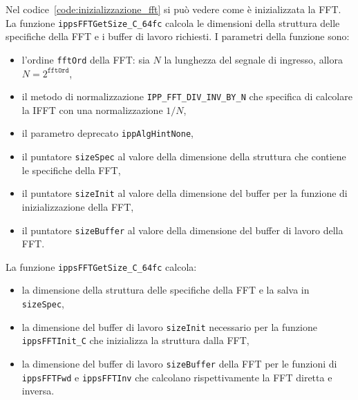 \documentclass[12pt,a4paper,titlepage]{article}
\begin{document}
Nel codice~\ref{code:inizializzazione_fft} si può vedere come è inizializzata la FFT. La funzione \texttt{ippsFFTGetSize\_C\_64fc} calcola le dimensioni della struttura delle specifiche della FFT e i buffer di lavoro richiesti. I parametri della funzione sono:
\begin{itemize}
\item l'ordine \texttt{fftOrd} della FFT: sia $N$ la lunghezza del segnale di ingresso, allora $N = 2^{ \texttt{fftOrd}}$,
\item il metodo di normalizzazione \texttt{IPP\_FFT\_DIV\_INV\_BY\_N} che specifica di calcolare la IFFT con una normalizzazione $1/N$,
\item il parametro deprecato \texttt{ippAlgHintNone},
\item il puntatore \texttt{sizeSpec} al valore della dimensione della struttura che contiene le specifiche della FFT,
\item il puntatore \texttt{sizeInit} al valore della dimensione del buffer per la funzione di inizializzazione della FFT,
\item il puntatore \texttt{sizeBuffer} al valore della dimensione del buffer di lavoro della FFT.
\end{itemize}
La funzione \texttt{ippsFFTGetSize\_C\_64fc} calcola:
\begin{itemize}
\item la dimensione della struttura delle specifiche della FFT e la salva in \texttt{sizeSpec},
\item la dimensione del buffer di lavoro \texttt{sizeInit} necessario per la funzione \texttt{ippsFFTInit\_C} che inizializza la struttura dalla FFT,
\item la dimensione del buffer di lavoro \texttt{sizeBuffer} della FFT  per le funzioni di \texttt{ippsFFTFwd} e \texttt{ippsFFTInv} che calcolano rispettivamente la FFT diretta e inversa.
\end{itemize}
\end{document}
